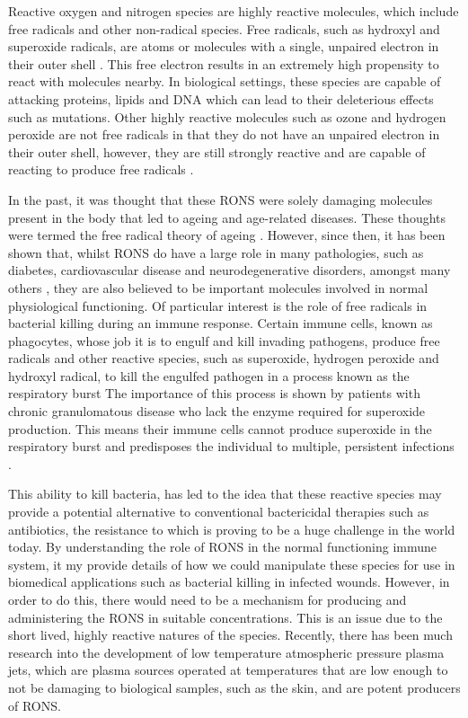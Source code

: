 \documentclass[11pt, oneside]{article}   	%
\begin{document}
Reactive oxygen and nitrogen species are highly reactive molecules, which include free radicals and other non-radical species. 
Free radicals, such as hydroxyl and superoxide radicals, are atoms or molecules with a single, unpaired electron in their outer shell \cite{PhamHuy2008}. 
This free electron results in an extremely high propensity to react with molecules nearby. 
In biological settings, these species are capable of attacking proteins, lipids and DNA \cite{PhamHuy2008} which can lead to their deleterious effects such as mutations.
Other highly reactive molecules such as ozone and hydrogen peroxide are not free radicals in that they do not have an unpaired electron in their outer shell, however, they are still strongly reactive and are capable of reacting to produce free radicals \cite{PhamHuy2008}.

In the past, it was thought that these RONS were solely damaging molecules present in the body that led to ageing and age-related diseases.
These thoughts were termed the free radical theory of ageing \cite{Harman1955}. 
However, since then, it has been shown that, whilst RONS do have a large role in many pathologies, such as diabetes, cardiovascular disease and neurodegenerative disorders, amongst many others \cite{Valko2007}, they are also believed to be important molecules involved in normal physiological functioning.
Of particular interest is the role of free radicals in bacterial killing during an immune response.
Certain immune cells, known as phagocytes, whose job it is to engulf and kill invading pathogens, produce free radicals and other reactive species, such as superoxide, hydrogen peroxide and hydroxyl radical, to kill the engulfed pathogen in a process known as the respiratory burst \cite{Janeway2011}
The importance of this process is shown by patients with chronic granulomatous disease who lack the enzyme required for superoxide production. This means their immune cells cannot produce superoxide in the respiratory burst and predisposes the individual to multiple, persistent infections \cite{Janeway2011, Babior2004}.


This ability to kill bacteria, has led to the idea that these reactive species may provide a potential alternative to conventional bactericidal therapies such as antibiotics, the resistance to which is proving to be a huge challenge in the world today. 
By understanding the role of RONS in the normal functioning immune system, it my provide details of how we could manipulate these species for use in biomedical applications such as bacterial killing in infected wounds.
However, in order to do this, there would need to be a mechanism for producing and administering the RONS in suitable concentrations.
This is an issue due to the short lived, highly reactive natures of the species.
Recently, there has been much research into the development of low temperature atmospheric pressure plasma jets, which are plasma sources operated at temperatures that are low enough to not be damaging to biological samples, such as the skin, and are potent producers of RONS. 
\end{document}
